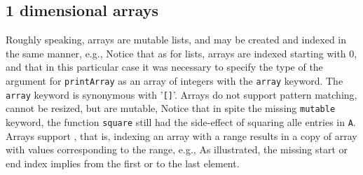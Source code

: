 \subsection{1 dimensional arrays}
Roughly speaking, arrays are mutable lists, and may be created and indexed in the same manner, e.g.,
Notice that as for lists, arrays are indexed starting with 0, and that in this particular case it was necessary to specify the type of the argument for \texttt{printArray} as an array of integers with the \texttt{array} keyword. The \texttt{array} keyword is synonymous with '\verb|[]|'. Arrays do not support pattern matching, cannot be resized, but are mutable,
Notice that in spite the missing \texttt{mutable} keyword, the function \texttt{square} still had the side-effect of squaring alle entries in \texttt{A}. Arrays support , that is, indexing an array with a range results in a copy of array with values corresponding to the range, e.g.,
As illustrated, the missing start or end index implies from the first or to the last element.


